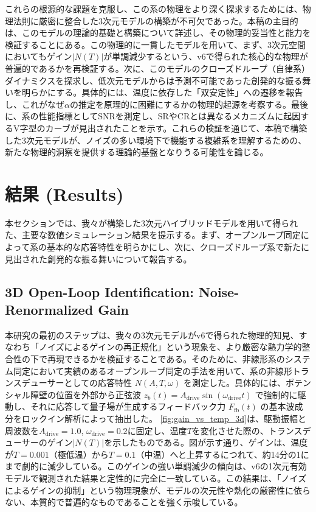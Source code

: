 \documentclass[a4paper,11pt,ja=standard,lualatex]{bxjsarticle}
\newcommand{\figref}[1]{\cref{#1}}
\begin{document}
これらの根源的な課題を克服し、この系の物理をより深く探求するためには、物理法則に厳密に整合した3次元モデルの構築が不可欠であった。本稿の主目的は、このモデルの理論的基礎と構築について詳述し、その物理的妥当性と能力を検証することにある。この物理的に一貫したモデルを用いて、まず、3次元空間においてもゲイン$|N(T)|$が単調減少するという、v6で得られた核心的な物理が普遍的であるかを再検証する。次に、このモデルのクローズドループ（自律系）ダイナミクスを探求し、低次元モデルからは予測不可能であった\mbox{創発}的な振る舞いを明らかにする。具体的には、温度に依存した「\mbox{双安定}性」への遷移を報告し、これがなぜ$\alpha$の推定を原理的に困難にするかの物理的起源を考察する。最後に、系の性能指標としてSNRを測定し、SRやCRとは異なるメカニズムに起因するV字型のカーブが見出されたことを示す。これらの検証を通じて、本稿で構築した3次元モデルが、ノイズの多い環境下で機能する複雑系を理解するための、新たな物理的洞察を提供する理論的基盤となりうる可能性を論じる。

\FloatBarrier

\section{結果 (Results)}
\label{sec:results}
本セクションでは、我々が構築した3次元ハイブリッドモデルを用いて得られた、主要な数値シミュレーション結果を提示する。まず、オープンループ同定によって系の基本的な応答特性を明らかにし、次に、クローズドループ系で新たに見出された\mbox{創発}的な振る舞いについて報告する。

\subsection{3D Open-Loop Identification: Noise-Renormalized Gain}
\label{subsec:openloop}
本研究の最初のステップは、我々の3次元モデルがv6で得られた物理的知見、すなわち「ノイズによるゲインの再正規化」という現象を、より厳密な熱力学的整合性の下で再現できるかを検証することである。そのために、非線形系のシステム同定において実績のあるオープンループ同定の手法を用いて、系の非線形トランスデューサーとしての応答特性 $N(A, T, \omega)$ を測定した。具体的には、ポテンシャル障壁の位置を外部から正弦波 $z_b(t) = A_{\mathrm{drive}}\sin(\omega_{\mathrm{drive}} t)$ で強制的に駆動し、それに応答して量子場が生成するフィードバック力 $F_{\mathrm{fb}}(t)$ の基本波成分をロックイン解析によって抽出した。
\figref{fig:gain_vs_temp_3d}は、駆動振幅と周波数を$A_{\mathrm{drive}}=1.0$, $\omega_{\mathrm{drive}}=0.2$に固定し、温度$T$を変化させた際の、トランスデューサーのゲイン$|N(T)|$を示したものである。図が示す通り、ゲインは、温度が$T=0.001$（極低温）から$T=0.1$（中温）へと上昇するにつれて、約14分の1にまで劇的に減少している。このゲインの強い単調減少の傾向は、v6の1次元有効モデルで観測された結果と定性的に完全に一致している。この結果は、「ノイズによるゲインの抑制」という物理現象が、モデルの次元性や熱化の厳密性に依らない、本質的で普遍的なものであることを強く示唆している。
\end{document}
